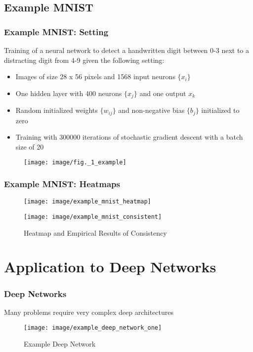 \documentclass{beamer}
\begin{document}
\subsection[Example MINST]{Example MNIST}



\begin{frame}
\frametitle{Example MNIST: Setting}
\vspace{0.5cm}
Training of a neural network to detect a handwritten digit between 0-3 next to a distracting digit from 4-9 given the following setting:
\begin{itemize}
\item Images of size 28 x 56 pixels and 1568 input neurons $\{x_i\}$
\item One hidden layer with 400 neurons $\{x_j\}$ and one output $x_k$
\item Random initialized weights $\{w_{ij}\}$ and non-negative bias $\{b_j\}$ initialized to zero
\item Training with 300000 iterations of stochastic gradient descent with a batch size of 20 
\end{itemize}
\begin{figure}
\texttt{[image: image/fig.\_1\_example]}

\end{figure}
\end{frame}


\begin{frame}
\frametitle{Example MNIST: Heatmaps}
\vspace{0.5cm}
\begin{figure}
\texttt{[image: image/example\_mnist\_heatmap]}
\end{figure}

\begin{figure}
\texttt{[image: image/example\_mnist\_consistent]}
\vspace{-0.75cm}
\caption{Heatmap and Empirical Results of Consistency}
\end{figure}


\end{frame}



\section[Application to Deep Networks]{Application to Deep Networks}


\begin{frame}
\frametitle{Deep Networks}
Many problems require very complex deep architectures

\begin{figure}
\label{fig1}
\texttt{[image: image/example\_deep\_network\_one]}
\vspace{-0.25cm}
\caption{Example Deep Network}

\end{figure}

\vspace{-1cm}
\end{frame}
\end{document}
